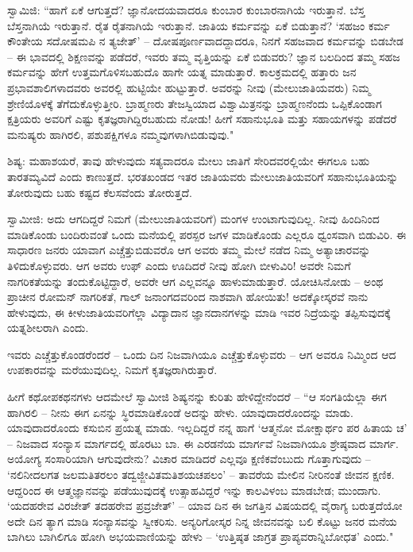 ಸ್ವಾಮಿಜಿ: “ಹಾಗೆ ಏಕೆ ಆಗುತ್ತದೆ? ಜ್ಞಾನೋದಯವಾದರೂ ಕುಂಬಾರ ಕುಂಬಾರನಾಗಿಯೆ ಇರುತ್ತಾನೆ. ಬೆಸ್ತ ಬೆಸ್ತನಾಗಿಯೆ ಇರುತ್ತಾನೆ. ರೈತ ರೈತನಾಗಿಯೆ ಇರುತ್ತಾನೆ. ಜಾತಿಯ ಕರ್ಮವನ್ನು ಏಕೆ ಬಿಡುತ್ತಾನೆ? ‘ಸಹಜಂ ಕರ್ಮ ಕೌಂತೇಯ ಸದೋಷಮಪಿ ನ ತ್ಯಜೇತ್’ – ದೋಷಪೂರ್ಣವಾದದ್ದಾದರೂ, ನಿನಗೆ ಸಹಜವಾದ ಕರ್ಮವನ್ನು ಬಿಡಬೇಡ – ಈ ಭಾವದಲ್ಲಿ ಶಿಕ್ಷಣವನ್ನು ಪಡೆದರೆ, ಇವರು ತಮ್ಮ ವೃತ್ತಿಯನ್ನು ಏಕೆ ಬಿಡುವರು? ಜ್ಞಾನ ಬಲದಿಂದ ತಮ್ಮ ಸಹಜ ಕರ್ಮವನ್ನು ಹೇಗೆ ಉತ್ತಮಗೊಳಿಸಬಹುದೊ ಹಾಗೇ ಯತ್ನ ಮಾಡುತ್ತಾರೆ. ಕಾಲಕ್ರಮದಲ್ಲಿ ಹತ್ತಾರು ಜನ ಪ್ರಭಾವಶಾಲಿಗಳಾದವರು ಅವರಲ್ಲಿ ಹುಟ್ಟಿಯೇ ಹುಟ್ಟುತ್ತಾರೆ. ಅವರನ್ನು ನೀವು (ಮೇಲುಜಾತಿಯವರು) ನಿಮ್ಮ ಶ್ರೇಣಿಯೊಳಕ್ಕೆ ತೆಗೆದುಕೊಳ್ಳುತ್ತೀರಿ. ಬ್ರಾಹ್ಮಣರು ತೇಜಸ್ವಿಯಾದ ವಿಶ್ವಾಮಿತ್ರನನ್ನು ಬ್ರಾಹ್ಮಣನೆಂದು ಒಪ್ಪಿಕೊಂಡಾಗ ಕ್ಷತ್ರಿಯರು ಅವರಿಗೆ ಎಷ್ಟು ಕೃತಜ್ಞರಾಗಿದ್ದಿರಬಹುದು ನೋಡು! ಹೀಗೆ ಸಹಾನುಭೂತಿ ಮತ್ತು ಸಹಾಯಗಳನ್ನು ಪಡೆದರೆ ಮನುಷ್ಯರು ಹಾಗಿರಲಿ, ಪಶುಪಕ್ಷಿಗಳೂ ನಮ್ಮವುಗಳಾಗಿಬಿಡುವುವು."

ಶಿಷ್ಯ: ಮಹಾಶಯರೆ, ತಾವು ಹೇಳುವುದು ಸತ್ಯವಾದರೂ ಮೇಲು ಜಾತಿಗೆ ಸೇರಿದವರಲ್ಲಿಯೇ ಈಗಲೂ ಬಹು ತಾರತಮ್ಯವಿದೆ ಎಂದು ಕಾಣುತ್ತದೆ. ಭರತಖಂಡದ ಇತರ ಜಾತಿಯವರು ಮೇಲುಜಾತಿಯವರಿಗೆ ಸಹಾನುಭೂತಿಯನ್ನು ತೋರುವುದು ಬಹು ಕಷ್ಟದ ಕೆಲಸವೆಂದು ತೋರುತ್ತದೆ.

ಸ್ವಾಮೀಜಿ: ಅದು ಆಗದಿದ್ದರೆ ನಿಮಗೆ (ಮೇಲುಜಾತಿಯವರಿಗೆ) ಮಂಗಳ ಉಂಟಾಗುವುದಿಲ್ಲ. ನೀವು ಹಿಂದಿನಿಂದ ಮಾಡಿಕೊಂಡು ಬಂದಿರುವಂತೆ ಒಂದು ಮನೆಯಲ್ಲಿ ಪರಸ್ಪರ ಜಗಳ ಮಾಡಿಕೊಂಡು ಎಲ್ಲರೂ ಧ್ವಂಸವಾಗಿ ಬಿಡುವಿರಿ. ಈ ಸಾಧಾರಣ ಜನರು ಯಾವಾಗ ಎಚ್ಚೆತ್ತುಬಿಡುವರೊ ಆಗ ಅವರು ತಮ್ಮ ಮೇಲೆ ನಡೆದ ನಿಮ್ಮ ಅತ್ಯಾಚಾರವನ್ನು ತಿಳಿದುಕೊಳ್ಳುವರು. ಆಗ ಅವರು ಉಫ್ ಎಂದು ಊದಿದರೆ ನೀವು ಹೋಗಿ ಬೀಳುವಿರಿ! ಅವರೇ ನಿಮಗೆ ನಾಗರಿಕತೆಯನ್ನು ತಂದುಕೊಟ್ಟಿದ್ದಾರೆ, ಅವರೇ ಆಗ ಎಲ್ಲವನ್ನೂ ಹಾಳುಮಾಡುತ್ತಾರೆ. ಯೋಚಿಸಿನೋಡು – ಅಂಥ ಪ್ರಾಚೀನ ರೋಮನ್ ನಾಗರಿಕತೆ, ಗಾಲ್ ಜನಾಂಗದವರಿಂದ ನಾಶವಾಗಿ ಹೋಯಿತು! ಅದಕ್ಕೋಸ್ಕರವೆ ನಾನು ಹೇಳುವುದು, ಈ ಕೀಳುಜಾತಿಯವರಿಗೆಲ್ಲಾ ವಿದ್ಯಾದಾನ ಜ್ಞಾನದಾನಗಳನ್ನು ಮಾಡಿ ಇವರ ನಿದ್ರೆಯನ್ನು ತಪ್ಪಿಸುವುದಕ್ಕೆ ಯತ್ನಶೀಲರಾಗಿ ಎಂದು.

ಇವರು ಎಚ್ಚೆತ್ತುಕೊಂಡರೆಂದರೆ – ಒಂದು ದಿನ ನಿಜವಾಗಿಯೂ ಎಚ್ಚೆತ್ತುಕೊಳ್ಳುವರು – ಆಗ ಅವರೂ ನಿಮ್ಮಿಂದ ಆದ ಉಪಕಾರವನ್ನು ಮರೆಯುವುದಿಲ್ಲ. ನಿಮಗೆ ಕೃತಜ್ಞರಾಗಿರುತ್ತಾರೆ.

ಹೀಗೆ ಕಥೋಪಕಥನಗಳು ಆದಮೇಲೆ ಸ್ವಾಮೀಜಿ ಶಿಷ್ಯನನ್ನು ಕುರಿತು ಹೇಳಿದ್ದೇನೆಂದರೆ – “ಆ ಸಂಗತಿಯೆಲ್ಲಾ ಈಗ ಹಾಗಿರಲಿ – ನೀನು ಈಗ ಏನನ್ನು ಸ್ಥಿರಮಾಡಿಕೊಂಡೆ ಅದನ್ನು ಹೇಳು. ಯಾವುದಾದರೊಂದನ್ನು ಮಾಡು. ಯಾವುದಾದರೊಂದು ಕಸುಬಿನ ಪ್ರಯತ್ನ ಮಾಡು. ಇಲ್ಲದಿದ್ದರೆ ನನ್ನ ಹಾಗೆ ‘ಆತ್ಮನೋ ಮೋಕ್ಷಾರ್ಥಂ ಪರ ಹಿತಾಯ ಚ’ – ನಿಜವಾದ ಸಂನ್ಯಾಸ ಮಾರ್ಗದಲ್ಲಿ ಹೊರಟು ಬಾ. ಈ ಎರಡನೆಯ ಮಾರ್ಗವೆ ನಿಜವಾಗಿಯೂ ಶ್ರೇಷ್ಠವಾದ ಮಾರ್ಗ. ಅಯೋಗ್ಯ ಸಂಸಾರಿಯಾಗಿ ಆಗುವುದೇನು? ವಿಚಾರ ಮಾಡಿದರೆ ಎಲ್ಲವೂ ಕ್ಷಣಿಕವೆಂಬುದು ಗೊತ್ತಾಗುವುದು – ‘ನಲಿನೀದಲಗತ ಜಲಮತಿತರಲಂ ತದ್ವಜ್ಜೀವಿತಮತಿಶಯಚಪಲಂ’ – ತಾವರೆಯ ಮೇಲಿನ ನೀರಿನಂತೆ ಜೀವನ ಕ್ಷಣಿಕ. ಆದ್ದರಿಂದ ಈ ಆತ್ಮಜ್ಞಾನವನ್ನು ಪಡೆಯುವುದಕ್ಕೆ ಉತ್ಸಾಹವಿದ್ದರೆ ಇನ್ನು ಕಾಲವಿಳಂಬ ಮಾಡಬೇಡ; ಮುಂದಾಗು. ‘ಯದಹರೇವ ವಿರಜೇತ್ ತದಹರೇವ ಪ್ರವ್ರಜೇತ್’ – ಯಾವ ದಿನ ಈ ಜಗತ್ತಿನ ವಿಷಯದಲ್ಲಿ ವೈರಾಗ್ಯ ಬರುತ್ತದೆಯೋ ಅದೇ ದಿನ ತ್ಯಾಗ ಮಾಡಿ ಸಂನ್ಯಾಸವನ್ನು ಸ್ವೀಕರಿಸು. ಅನ್ಯರಿಗೋಸ್ಕರ ನಿನ್ನ ಜೀವನವನ್ನು ಬಲಿ ಕೊಟ್ಟು ಜನರ ಮನೆಯ ಬಾಗಿಲು ಬಾಗಿಲಿಗೂ ಹೋಗಿ ಅಭಯವಾಣಿಯನ್ನು ಹೇಳು – ‘ಉತ್ತಿಷ್ಠತ ಜಾಗ್ರತ ಪ್ರಾಪ್ಯವರಾನ್ನಿಬೋಧತ’ ಎಂದು."

